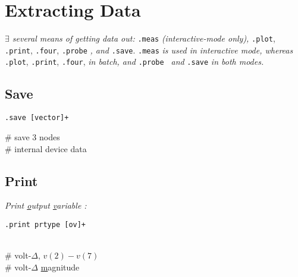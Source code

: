 \section{Extracting Data}

\textit{$\exists$ several means of getting data out: } \texttt{.meas} \textit{ (interactive-mode only), }\texttt{.plot}, \texttt{.print}, \texttt{.four}, \texttt{.probe} \textit{, and }\texttt{.save}. \texttt{.meas}\textit{ is used in interactive mode, whereas }\texttt{ .plot}, \texttt{.print}, \texttt{.four}, \textit{ in batch, and }\texttt{.probe }\textit{ and }\texttt{.save}\textit{ in both modes.}\\


\subsection*{Save}

\begin{lstlisting}
.save [vector]+
\end{lstlisting}
 \# {\scriptsize save 3 nodes}\\
 \# {\scriptsize internal device data}\\[1mm]

\subsection*{Print}
\textit{Print \underline{o}utput \underline{v}ariable :}\\
\begin{lstlisting}
.print prtype [ov]+
\end{lstlisting}
 \\
 \# {\scriptsize volt-$\Delta$, $v(2)-v(7)$}\\
 \# {\scriptsize volt-$\Delta$ \underline{m}agnitude}\\[1mm]

